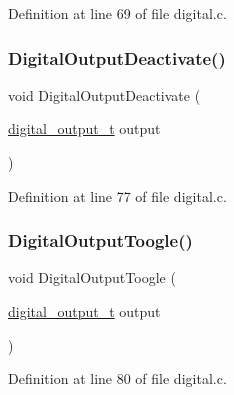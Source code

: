 Definition at line 69 of file digital.\+c.

\mbox{\label{group__name_ga0d953039d5fb5d7166f961689475161e}} 
\subsubsection{\texorpdfstring{Digital\+Output\+Deactivate()}{DigitalOutputDeactivate()}}
{\footnotesize\ttfamily void Digital\+Output\+Deactivate (\begin{DoxyParamCaption}\item[{\hyperlink{group___plantilla_ga3e63b19d3d0dbfbfb2c50b3ac1f69aa0}{digital\+\_\+output\+\_\+t}}]{output }\end{DoxyParamCaption})}



Definition at line 77 of file digital.\+c.

\mbox{\label{group__name_ga7f1a1e6f816d67f9090602e3257be6a6}} 
\subsubsection{\texorpdfstring{Digital\+Output\+Toogle()}{DigitalOutputToogle()}}
{\footnotesize\ttfamily void Digital\+Output\+Toogle (\begin{DoxyParamCaption}\item[{\hyperlink{group___plantilla_ga3e63b19d3d0dbfbfb2c50b3ac1f69aa0}{digital\+\_\+output\+\_\+t}}]{output }\end{DoxyParamCaption})}



Definition at line 80 of file digital.\+c.

